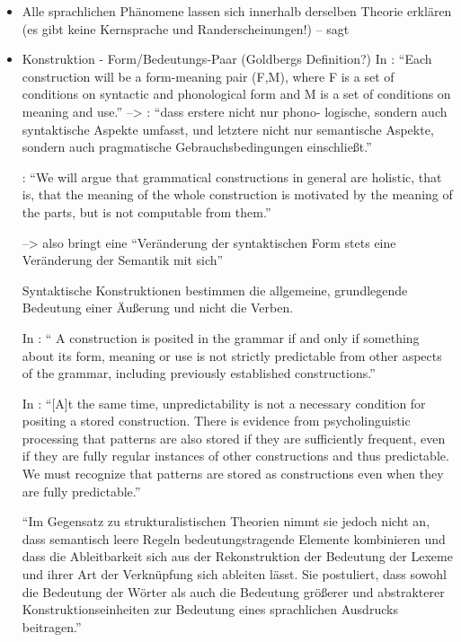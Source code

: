 \begin{itemize}
    \item Alle sprachlichen Phänomene lassen sich innerhalb derselben Theorie erklären (es gibt keine Kernsprache und Randerscheinungen!) -- sagt \cite{Tomasello06}
\item Konstruktion - Form/Bedeutungs-Paar (Goldbergs Definition?)
    In \cite{Lakoff87}: ``Each construction will be a form-meaning pair (F,M), where F is a set of conditions on syntactic
    and phonological form and M is a set of conditions on meaning and use.'' --> \cite{Ziem13}: ``dass erstere nicht nur phono-
    logische, sondern auch syntaktische Aspekte umfasst, und letztere nicht nur semantische
    Aspekte, sondern auch pragmatische Gebrauchsbedingungen einschließt.''

    \cite{Lakoff87}: ``We will argue that grammatical constructions in general are holistic, that is, that the
    meaning of the whole construction is motivated by the meaning of the parts, but is not computable
    from them.''

     --> also bringt eine ``Veränderung der syntaktischen Form stets eine Veränderung der Semantik mit sich''

    Syntaktische Konstruktionen bestimmen die allgemeine, grundlegende Bedeutung einer Äußerung und nicht die Verben.

    In \cite{Goldberg95}: `` A construction is posited in the grammar if and only if something about its form, meaning or use is not strictly predictable from other aspects of the grammar, including previously established constructions.''

    In \cite{Goldberg06}: ``[A]t the same time, unpredictability is not a necessary condition for positing a stored construction.
    There is evidence from psycholinguistic processing that patterns are also stored if they are sufficiently frequent, even if they are fully regular instances of other constructions and thus predictable.
    We must recognize that patterns are stored as constructions even when they are fully predictable.''

    ``Im Gegensatz zu strukturalistischen Theorien nimmt sie jedoch nicht an, dass semantisch leere Regeln bedeutungstragende Elemente kombinieren und dass die Ableitbarkeit sich aus der Rekonstruktion der Bedeutung der Lexeme und ihrer Art der Verknüpfung sich ableiten lässt.
    Sie postuliert, dass sowohl die Bedeutung der Wörter als auch die Bedeutung größerer und abstrakterer Konstruktionseinheiten zur Bedeutung eines sprachlichen Ausdrucks beitragen.''


\end{itemize}
